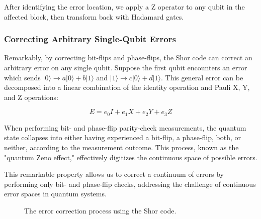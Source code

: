 \documentclass[12pt,a4paper]{article}
\begin{document}
After identifying the error location, we apply a Z operator to any qubit in the affected block, then transform back with Hadamard gates.

\subsubsection{Correcting Arbitrary Single-Qubit Errors}

Remarkably, by correcting bit-flips and phase-flips, the Shor code can correct an arbitrary error on any single qubit. Suppose the first qubit encounters an error which sends $|0\rangle \rightarrow a|0\rangle+b|1\rangle$ and $|1\rangle \rightarrow c|0\rangle+d|1\rangle$. This general error can be decomposed into a linear combination of the identity operation and Pauli X, Y, and Z operations:

\begin{equation}
E = e_0 I + e_1 X + e_2 Y + e_3 Z
\end{equation}

When performing bit- and phase-flip parity-check measurements, the quantum state collapses into either having experienced a bit-flip, a phase-flip, both, or neither, according to the measurement outcome. This process, known as the "quantum Zeno effect," effectively digitizes the continuous space of possible errors.

This remarkable property allows us to correct a continuum of errors by performing only bit- and phase-flip checks, addressing the challenge of continuous error spaces in quantum systems.

\begin{figure}[H]
    \centering
    \caption{The error correction process using the Shor code.}
    \label{fig:error_correction_process}
\end{figure}
\end{document}

